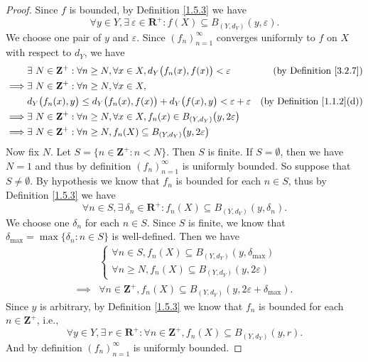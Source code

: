 \begin{proof}
    Since \(f\) is bounded, by Definition \ref{1.5.3} we have
    \[
        \forall y \in Y, \exists\ \varepsilon \in \mathbf{R}^+ : f(X) \subseteq B_{(Y, d_Y)}(y, \varepsilon).
    \]
    We choose one pair of \(y\) and \(\varepsilon\).
    Since \((f_n)_{n = 1}^\infty\) converges uniformly to \(f\) on \(X\) with respect to \(d_Y\), we have
    \begin{align*}
                 & \exists\ N \in \mathbf{Z}^+ : \forall n \geq N, \forall x \in X, d_Y\big(f_n(x), f(x)\big) < \varepsilon          & \text{(by Definition \ref{3.2.7})}    \\
        \implies & \exists\ N \in \mathbf{Z}^+ : \forall n \geq N, \forall x \in X,                                                                                          \\
                 & d_Y\big(f_n(x), y\big) \leq d_Y\big(f_n(x), f(x)\big) + d_Y\big(f(x), y\big) < \varepsilon + \varepsilon          & \text{(by Definition \ref{1.1.2}(d))} \\
        \implies & \exists\ N \in \mathbf{Z}^+ : \forall n \geq N, \forall x \in X, f_n(x) \in B_{(Y, d_Y)}\big(y, 2\varepsilon\big)                                         \\
        \implies & \exists\ N \in \mathbf{Z}^+ : \forall n \geq N, f_n(X) \subseteq B_{(Y, d_Y)}\big(y, 2\varepsilon\big)
    \end{align*}
    Now fix \(N\).
    Let \(S = \{n \in \mathbf{Z}^+ : n < N\}\).
    Then \(S\) is finite.
    If \(S = \emptyset\), then we have \(N = 1\) and thus by definition \((f_n)_{n = 1}^\infty\) is uniformly bounded.
    So suppose that \(S \neq \emptyset\).
    By hypothesis we know that \(f_n\) is bounded for each \(n \in S\), thus by Definition \ref{1.5.3} we have
    \[
        \forall n \in S, \exists\ \delta_n \in \mathbf{R}^+ : f_n(X) \subseteq B_{(Y, d_Y)}(y, \delta_n).
    \]
    We choose one \(\delta_n\) for each \(n \in S\).
    Since \(S\) is finite, we know that \(\delta_{\max} = \max\{\delta_n : n \in S\}\) is well-defined.
    Then we have
    \begin{align*}
                 & \begin{cases}
                       \forall n \in S, f_n(X) \subseteq B_{(Y, d_Y)}(y, \delta_{\max}) \\
                       \forall n \geq N, f_n(X) \subseteq B_{(Y, d_Y)}(y, 2\varepsilon)
                   \end{cases}                            \\
        \implies & \forall n \in \mathbf{Z}^+, f_n(X) \subseteq B_{(Y, d_Y)}(y, 2\varepsilon + \delta_{\max}).
    \end{align*}
    Since \(y\) is arbitrary, by Definition \ref{1.5.3} we know that \(f_n\) is bounded for each \(n \in \mathbf{Z}^+\), i.e.,
    \[
        \forall y \in Y, \exists\ r \in \mathbf{R}^+ : \forall n \in \mathbf{Z}^+, f_n(X) \subseteq B_{(Y, d_Y)}(y, r).
    \]
    And by definition \((f_n)_{n = 1}^\infty\) is uniformly bounded.
\end{proof}